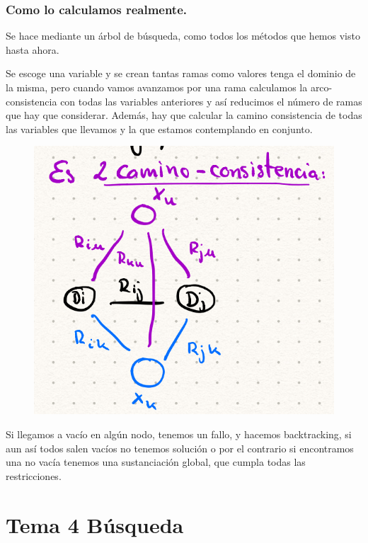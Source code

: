 \documentclass[12pt, twoside, openright]{report} %
\begin{document}
\subsection{Como lo calculamos realmente.}


  Se hace mediante un árbol de búsqueda, como todos los métodos que
  hemos visto hasta ahora.


    Se escoge una variable y se crean tantas ramas como valores tenga el
    dominio de la misma, pero cuando vamos avanzamos por una rama
    calculamos la arco-consistencia con todas las variables anteriores y
    así reducimos el número de ramas que hay que considerar. Además, hay
    que calcular la camino consistencia de todas las variables que
    llevamos y la que estamos contemplando en conjunto.
	\begin{figure}[H]
		{\includegraphics[scale=.23]{Untitled 42.png}}
	\end{figure}    Si llegamos a vacío en algún nodo, tenemos un fallo, y hacemos
    backtracking, si aun así todos salen vacíos no tenemos solución o
    por el contrario si encontramos una no vacía tenemos una
    sustanciación global, que cumpla todas las restricciones.

	

\chapter{Tema 4 Búsqueda}
\end{document}
